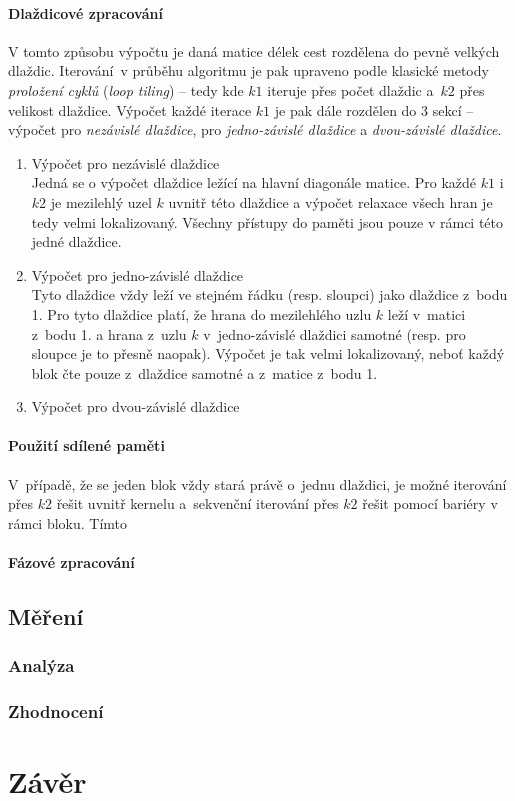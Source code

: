 \paragraph{Dlaždicové zpracování}
V tomto způsobu výpočtu je daná matice délek cest rozdělena do pevně velkých dlaždic. Iterování~v průběhu algoritmu je pak
upraveno podle klasické metody \emph{proložení cyklů} (\emph{loop tiling}) -- tedy kde $k1$ iteruje přes počet dlaždic 
a~$k2$ přes velikost dlaždice. Výpočet každé iterace $k1$ je pak dále rozdělen do
3 sekcí -- výpočet pro \emph{nezávislé dlaždice}, pro \emph{jedno-závislé dlaždice} a \emph{dvou-závislé dlaždice}.
\begin{enumerate}
    \item Výpočet pro nezávislé dlaždice \hfil \\
        Jedná se o výpočet dlaždice ležící na hlavní diagonále matice. Pro každé $k1$ i~$k2$ je mezilehlý uzel $k$ uvnitř této
        dlaždice a výpočet relaxace všech hran je tedy velmi lokalizovaný. Všechny přístupy do paměti jsou pouze v rámci této jedné dlaždice.

    \item Výpočet pro jedno-závislé dlaždice \hfil \\
        Tyto dlaždice vždy leží ve stejném řádku (resp. sloupci) jako dlaždice z~bodu 1. Pro tyto dlaždice platí, že hrana do 
        mezilehlého uzlu $k$ leží v~matici z~bodu 1. a hrana z~uzlu $k$ v~jedno-závislé dlaždici samotné (resp. pro sloupce je to 
        přesně naopak). Výpočet je tak velmi lokalizovaný, neboť každý blok čte pouze z~dlaždice samotné a z~matice z~bodu 1.

    \item Výpočet pro dvou-závislé dlaždice \hfil \\

\end{enumerate}

\paragraph{Použití sdílené paměti}
V~případě, že se jeden blok vždy stará právě o~jednu dlaždici, je možné iterování přes $k2$ řešit uvnitř kernelu a~sekvenční iterování
přes $k2$ řešit pomocí bariéry v rámci bloku. Tímto

\paragraph{Fázové zpracování}

\subsection{Měření}\label{l:cuda:mereni}
\subsubsection{Analýza}
\subsubsection{Zhodnocení}


\section{Závěr}




\clearpage





